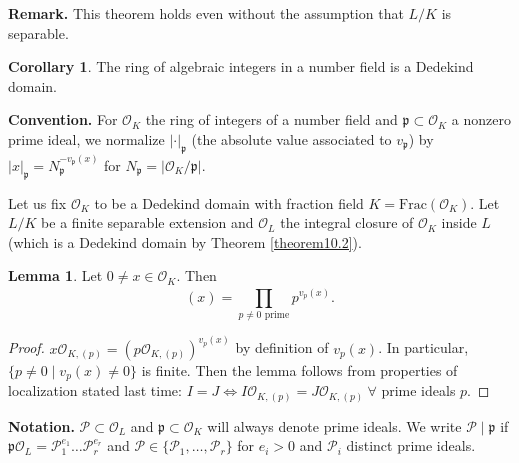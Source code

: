 \documentclass{article}
\theoremstyle{definition}
\newtheorem{lemma}[theorem]{Lemma}
\newtheorem{cor}[theorem]{Corollary}
\begin{document}
\textbf{Remark.} This theorem holds even without the assumption that $L/K$ is separable.
\begin{cor}
    The ring of algebraic integers in a number field is a Dedekind domain.
\end{cor}
\textbf{Convention.} For $\mathcal{O}_K$ the ring of integers of a number field and $\mathfrak{p} \subset \mathcal{O}_K$ a nonzero prime ideal, we normalize $|\cdot|_{\mathfrak{p}}$ (the absolute value associated to $v_\mathfrak{p}$) by $|x|_{\mathfrak{p}} = N_{\mathfrak{p}}^{-v_\mathfrak{p}(x)}$ for $N_{\mathfrak{p}} = |\mathcal{O}_K/\mathfrak{p}|$.


Let us fix $\mathcal{O}_K$ to be a Dedekind domain with fraction field $K = \text{Frac}(\mathcal{O}_K)$. Let $L/K$ be a finite separable extension and $\mathcal{O}_L$ the integral closure of $\mathcal{O}_K$ inside $L$ (which is a Dedekind domain by Theorem \ref{theorem10.2}).

\begin{lemma}\label{lemma10.4}
    Let $0 \neq x \in \mathcal{O}_K$. Then $$(x) = \prod_{p \neq 0 \text{ prime}}^{} p^{v_p(x)}.$$
\end{lemma}
\begin{proof}
    $x \mathcal{O}_{K,(p)} = (p \mathcal{O}_{K,(p)})^{v_p(x)}$ by definition of $v_p(x)$. In particular, $\{p \neq 0 \mid v_p(x) \neq 0\}$ is finite. Then the lemma follows from properties of localization stated last time: $I = J \iff I \mathcal{O}_{K,(p)} = J \mathcal{O}_{K,(p)} ~\forall $ prime ideals $p$.
\end{proof}
\textbf{Notation.} $\mathcal{P} \subset \mathcal{O}_L$ and $\mathfrak{p} \subset \mathcal{O}_K$ will always denote prime ideals. We write $\mathcal{P} \mid \mathfrak{p}$ if $\mathfrak{p}\mathcal{O}_L = \mathcal{P}_1^{e_1}\ldots \mathcal{P}_r^{e_r}$ and $\mathcal{P} \in \{\mathcal{P}_1,\ldots,\mathcal{P}_r\}$ for $e_i>0$ and $\mathcal{P}_i$ distinct prime ideals. 
\end{document}
